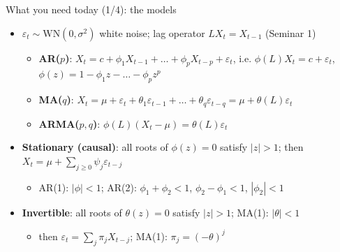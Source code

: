 \begin{frame}{What you need today (1/4): the models}
\itemsize{\small}
\begin{itemize}
    \item $\varepsilon_t \sim \mathrm{WN}(0, \sigma^2)$ white noise; lag operator $LX_t = X_{t-1}$ (Seminar 1)
    \begin{itemize}
        \item \textbf{AR($p$)}: $X_t = c + \phi_1X_{t-1} + \dots + \phi_pX_{t-p} + \varepsilon_t$, i.e. $\phi(L)X_t = c + \varepsilon_t$, $\phi(z) = 1 - \phi_1z - \dots - \phi_pz^p$
        \item \textbf{MA($q$)}: $X_t = \mu + \varepsilon_t + \theta_1\varepsilon_{t-1} + \dots + \theta_q\varepsilon_{t-q} = \mu + \theta(L)\varepsilon_t$
        \item \textbf{ARMA($p,q$)}: $\phi(L)(X_t - \mu) = \theta(L)\varepsilon_t$
    \end{itemize}
    \item \textbf{Stationary (causal)}: all roots of $\phi(z) = 0$ satisfy $|z| > 1$; then $X_t = \mu + \sum_{j \ge 0}\psi_j\varepsilon_{t-j}$
    \begin{itemize}
        \item AR(1): $|\phi| < 1$; AR(2): $\phi_1 + \phi_2 < 1$, $\phi_2 - \phi_1 < 1$, $|\phi_2| < 1$
    \end{itemize}
    \item \textbf{Invertible}: all roots of $\theta(z) = 0$ satisfy $|z| > 1$; MA(1): $|\theta| < 1$
    \begin{itemize}
        \item then $\varepsilon_t = \sum_j\pi_jX_{t-j}$; MA(1): $\pi_j = (-\theta)^j$
    \end{itemize}
\end{itemize}
\end{frame}

